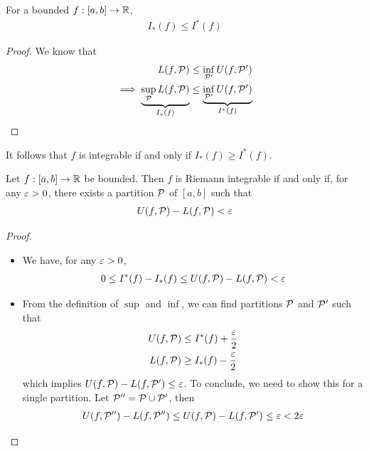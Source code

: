 \documentclass{../../template/note}
\begin{document}
    \begin{lemma}
        For a bounded \(f: [a, b] \to \mathbb R\),
        \begin{align*}
            I_*(f) \leq I^*(f)
        \end{align*}
    \end{lemma}

    \begin{proof}
        We know that
        \begin{align*}
            L(f, \mathcal{P}) &\leq \inf_{\mathcal{P}'} U(f, \mathcal{P}') \\
            \implies \underbrace{\sup_{\mathcal{P}} L(f, \mathcal{P})}_{I_*(f)} &\leq \underbrace{\inf_{\mathcal{P}'} U(f, \mathcal{P}')}_{I^*(f)}
        \end{align*}
    \end{proof}
    
    \begin{remark*}
        It follows that \(f\) is integrable if and only if \(I_*(f) \geq I^*(f)\).
    \end{remark*}
    
    \begin{proposition}
        Let \(f: [a, b] \to \mathbb R\) be bounded. Then \(f\) is Riemann integrable if and only if, for any \(\varepsilon > 0\), there exists a partition \(\mathcal{P}\) of \([a, b]\) such that
        \begin{align*}
            U(f, \mathcal{P}) - L(f, \mathcal{P}) < \varepsilon
        \end{align*}
    \end{proposition}

    \begin{proof}
        \begin{itemize}
            \item[\(\impliedby\)] We have, for any \(\varepsilon > 0\),
            \begin{align*}
                0 \leq I^*(f) - I_*(f) \leq U(f, \mathcal{P}) - L(f, \mathcal{P}) < \varepsilon
            \end{align*}
            \item[\(\implies\)] From the definition of \(\sup\) and \(\inf\), we can find partitions \(\mathcal{P}\) and \(\mathcal{P}'\) such that
            \begin{align*}
                U(f, \mathcal{P}) &\leq I^*(f) + \frac{\varepsilon} 2 \\
                L(f, \mathcal{P}) &\geq I_*(f) - \frac{\varepsilon} 2
            \end{align*}
            which implies \(U(f, \mathcal{P}) - L(f, \mathcal{P}') \leq \varepsilon\). To conclude, we need to show this for a single partition. Let \(\mathcal{P}'' = \mathcal{P} \cup \mathcal{P}'\), then
            \begin{align*}
                U(f, \mathcal{P}'') - L(f, \mathcal{P}'') \leq U(f, \mathcal{P}) - L(f, \mathcal{P}') \leq \varepsilon < 2\varepsilon
            \end{align*}
        \end{itemize}
    \end{proof}
    
\end{document}
